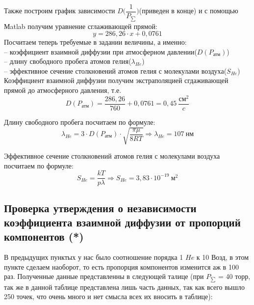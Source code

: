 \documentclass[a4paper,11.5pt]{article} %
\begin{document}
Также построим график зависимости $D\bigg(\dfrac{1}{P_{\sum}}\bigg)$(приведен в конце) и с помощью Мatlab получим уравнение сглаживающей прямой:
\begin{equation}
	y = 286,26\cdot x + 0,0761
\end{equation}
Посчитаем теперь требуемые в задании величины, а именно:\\
	-- коэффициент взаимной диффузии при атмосферном давлении($D(P_{\text{атм}})$) \\
	-- длину свободного пробега атомов гелия($\lambda_{He}$)\\
	-- эффективное сечение столкновений атомов гелия с молекулами воздуха($S_{He}$)\\
	
Коэффициент взаимной диффузии получим экстраполяцией сгдаживающей прямой до атмосферного давления, т.е.
\begin{equation}
	D(P_{\text{атм}}) = \frac{286,26}{760} + 0,0761 = 0,45\ \frac{\text{см}^2}{c}
\end{equation}

Длину свободного пробега посчитаем по формуле:
\begin{equation}
	\lambda_{He} = 3\cdot D(P_{\text{атм}})\cdot \sqrt{\dfrac{\pi \mu}{8RT}} \Rightarrow  \lambda_{He} = 107\ \text{нм}
\end{equation}

Эффективное сечение столкновений атомов гелия с молекулами воздуха посчитаем по формуле:
\begin{equation}
	S_{He} = \frac{kT}{p\lambda} \Rightarrow S_{He} = 3,83 \cdot 10^{-19}\ \text{м}^2
\end{equation}


\subsection{Проверка утверждения о независимости коэффициента взаимной диффузии от пропорций компонентов (*)}

В предыдущих пунктых у нас было соотношение порядка 1 $He$ к 10 Возд, в этом пункте сделаем наоборот, то есть пропорция компонентов изменится аж в 100 раз. Полученные данные представленны в следующей талице (при $P_{\sum}$ = 40 торр, так же в данной таблице представлена лишь часть данных, так как всего вышло 250 точек, что очень много и нет смысла всех их вносить в таблице):
\end{document}
